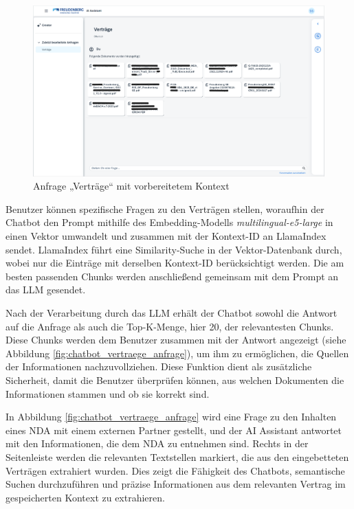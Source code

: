 \begin{figure}[H]
    \centering
    \includegraphics[width=1\textwidth]{img/Chatbot_vertraege_leer.png}
    \caption{Anfrage „Verträge“ mit vorbereitetem Kontext}
    \label{fig:chatbot_vertraege_leer}
\end{figure}

Benutzer können spezifische Fragen zu den Verträgen stellen, woraufhin der Chatbot den Prompt mithilfe des Embedding-Modells \textit{multilingual-e5-large} in einen Vektor umwandelt und zusammen mit der Kontext-ID an LlamaIndex sendet. 
LlamaIndex führt eine Similarity-Suche in der Vektor-Datenbank durch, wobei nur die Einträge mit derselben Kontext-ID berücksichtigt werden. 
Die am besten passenden Chunks werden anschließend gemeinsam mit dem Prompt an das \ac{LLM} gesendet. 

Nach der Verarbeitung durch das \ac{LLM} erhält der Chatbot sowohl die Antwort auf die Anfrage als auch die Top-K-Menge, hier 20, der relevantesten Chunks. 
Diese Chunks werden dem Benutzer zusammen mit der Antwort angezeigt (siehe Abbildung \ref{fig:chatbot_vertraege_anfrage}), um ihm zu ermöglichen, die Quellen der Informationen nachzuvollziehen. 
Diese Funktion dient als zusätzliche Sicherheit, damit die Benutzer überprüfen können, aus welchen Dokumenten die Informationen stammen und ob sie korrekt sind.

In Abbildung \ref{fig:chatbot_vertraege_anfrage} wird eine Frage zu den Inhalten eines \ac{NDA} mit einem externen Partner gestellt, und der AI Assistant antwortet mit den Informationen, die dem \ac{NDA} zu entnehmen sind. 
Rechts in der Seitenleiste werden die relevanten Textstellen markiert, die aus den eingebetteten Verträgen extrahiert wurden. 
Dies zeigt die Fähigkeit des Chatbots, semantische Suchen durchzuführen und präzise Informationen aus dem relevanten Vertrag im gespeicherten Kontext zu extrahieren.

